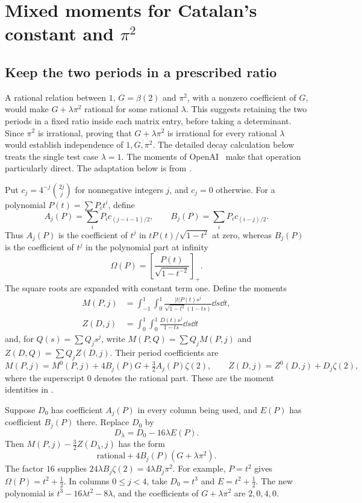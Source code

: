 \section{Mixed moments for Catalan's constant and \texorpdfstring{$\pi^2$}{pi squared}}\label{sec:moments}

\subsection{Keep the two periods in a prescribed ratio}

A rational relation between $1$, $G=\beta(2)$ and $\pi^2$, with a
nonzero coefficient of $G$, would make $G+\lambda\pi^2$ rational for
some rational $\lambda$. This suggests retaining the two periods in a
fixed ratio inside each matrix entry, before taking a determinant.
Since $\pi^2$ is irrational, proving that $G+\lambda\pi^2$ is
irrational for every rational $\lambda$ would establish independence
of $1,G,\pi^2$. The detailed decay calculation below treats the single
test case $\lambda=1$.
The moments of OpenAI~\cite[Section~2]{OpenAI} make that operation
particularly direct. The adaptation below is from .

Put $c_j=4^{-j}\binom{2j}{j}$ for nonnegative integers $j$, and $c_j=0$
otherwise. For a polynomial $P(t)=\sum P_it^i$, define
\[
 A_j(P)=\sum_iP_i c_{(j-i-1)/2},\qquad
 B_j(P)=\sum_iP_i c_{(i-j)/2}.
\]
Thus $A_j(P)$ is the coefficient of $t^j$ in
$tP(t)/\sqrt{1-t^2}$ at zero, whereas $B_j(P)$ is the coefficient of
$t^j$ in the polynomial part at infinity
\[
 \Omega(P)=\left[\frac{P(t)}{\sqrt{1-t^{-2}}}\right]_+.
\]
The square roots are expanded with constant term one. Define the moments
\begin{align*}
 M(P,j)&=\int_{-1}^1\int_0^1
  \frac{|t|P(t)s^j}{\sqrt{1-t^2}(1-ts)}\dd s\dd t,\\
 Z(D,j)&=\int_0^1\int_0^1\frac{D(t)s^j}{1-ts}\dd s\dd t
\end{align*}
and, for $Q(s)=\sum Q_js^j$, write
$M(P,Q)=\sum Q_jM(P,j)$ and $Z(D,Q)=\sum Q_jZ(D,j)$.
Their period coefficients are
\begin{equation}\label{eq:moment-periods}
 M(P,j)=M^0(P,j)+4B_j(P)G+\tfrac32A_j(P)\zeta(2),\qquad
 Z(D,j)=Z^0(D,j)+D_j\zeta(2),
\end{equation}
where the superscript $0$ denotes the rational part. These are the
moment identities in \cite[(17)]{OpenAI}.

Suppose $D_0$ has coefficient $A_j(P)$ in every column being used,
and $E(P)$ has coefficient $B_j(P)$ there. Replace $D_0$ by
\[
 D_\lambda=D_0-16\lambda E(P).
\]
Then $M(P,j)-\tfrac32Z(D_\lambda,j)$ has the form
\begin{equation}\label{eq:mixed-entry}
 \text{rational}+4B_j(P)(G+\lambda\pi^2).
\end{equation}
The factor $16$ supplies $24\lambda B_j\zeta(2)=4\lambda B_j\pi^2$.
For example, $P=t^2$ gives $\Omega(P)=t^2+\tfrac12$. In columns
$0\le j<4$, take $D_0=t^3$ and $E=t^2+\tfrac12$. The new polynomial
is $t^3-16\lambda t^2-8\lambda$, and the coefficients of
$G+\lambda\pi^2$ are $2,0,4,0$.


